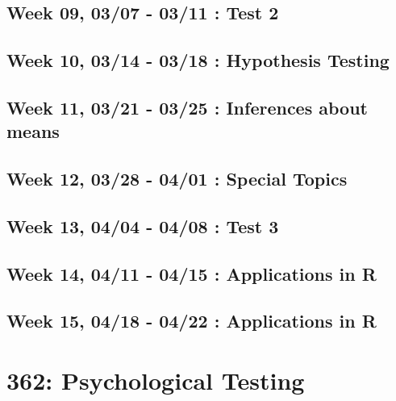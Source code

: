 \documentclass[
]{book}
\begin{document}
\hypertarget{week-09-0307---0311-test-2}{%
\section{Week 09, 03/07 - 03/11 : Test 2}\label{week-09-0307---0311-test-2}}

\hypertarget{week-10-0314---0318-hypothesis-testing}{%
\section{Week 10, 03/14 - 03/18 : Hypothesis Testing}\label{week-10-0314---0318-hypothesis-testing}}

\hypertarget{week-11-0321---0325-inferences-about-means}{%
\section{Week 11, 03/21 - 03/25 : Inferences about means}\label{week-11-0321---0325-inferences-about-means}}

\hypertarget{week-12-0328---0401-special-topics}{%
\section{Week 12, 03/28 - 04/01 : Special Topics}\label{week-12-0328---0401-special-topics}}

\hypertarget{week-13-0404---0408-test-3}{%
\section{Week 13, 04/04 - 04/08 : Test 3}\label{week-13-0404---0408-test-3}}

\hypertarget{week-14-0411---0415-applications-in-r}{%
\section{Week 14, 04/11 - 04/15 : Applications in R}\label{week-14-0411---0415-applications-in-r}}

\hypertarget{week-15-0418---0422-applications-in-r}{%
\section{Week 15, 04/18 - 04/22 : Applications in R}\label{week-15-0418---0422-applications-in-r}}

\hypertarget{testing}{%
\chapter*{362: Psychological Testing}\label{testing}}
\end{document}
